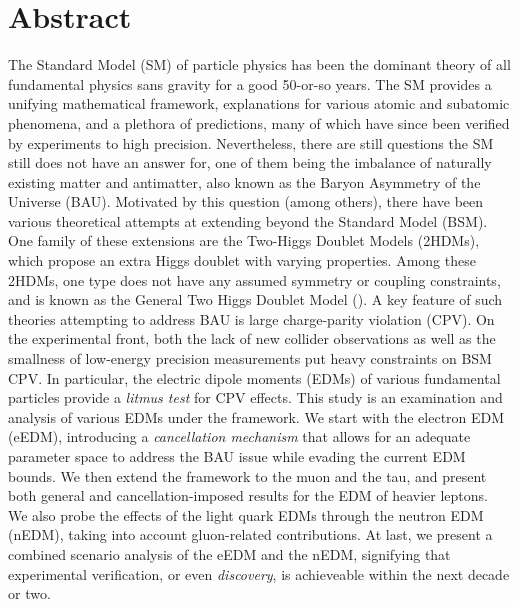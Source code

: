 \chapter{Abstract}
\label{ch:abstract}
The Standard Model (SM) of particle physics has been the dominant theory of all fundamental physics sans gravity for a good 50-or-so years.
The SM provides a unifying mathematical framework, explanations for various atomic and subatomic phenomena,
and a plethora of predictions, many of which have since been verified by experiments to high precision.
Nevertheless, there are still questions the SM still does not have an answer for, 
one of them being the imbalance of naturally existing matter and antimatter,
also known as the Baryon Asymmetry of the Universe (BAU).
Motivated by this question (among others), there have been various theoretical attempts at extending beyond the Standard Model (BSM).
One family of these extensions are the Two-Higgs Doublet Models (2HDMs), which propose an extra Higgs doublet with varying properties.
Among these 2HDMs, one type does not have any assumed symmetry or coupling constraints, and is known as the General Two Higgs Doublet Model ({\gthdm}).
A key feature of such theories attempting to address BAU is large charge-parity violation (CPV).
On the experimental front, both the lack of new collider observations as well as the smallness of low-energy precision measurements put heavy constraints on BSM CPV.
In particular, the electric dipole moments (EDMs) of various fundamental particles provide a \textit{litmus test} for CPV effects.
This study is an examination and analysis of various EDMs under the {\gthdm} framework. 
We start with the electron EDM (eEDM), introducing a \textit{cancellation mechanism} that allows for an adequate parameter space to address the BAU issue while evading the current EDM bounds.
We then extend the framework to the muon and the tau, and present both general and cancellation-imposed results for the EDM of heavier leptons.
We also probe the effects of the light quark EDMs through the neutron EDM (nEDM), taking into account gluon-related contributions.
At last, we present a combined scenario analysis of the eEDM and the nEDM, signifying that experimental verification, or even \textit{discovery}, is achieveable within the next decade or two.